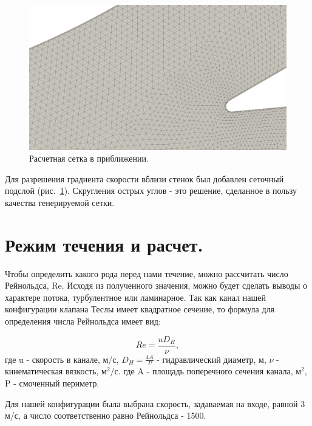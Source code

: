 \documentclass[14pt,a4paper]{article}
\begin{document}
        \begin{figure}[H]
            \centering
            \includegraphics[width = 1\linewidth]{teslaMesh2}
            \caption{Расчетная сетка в приближении.}
            \label{fig:teslaMesh2}
        \end{figure}   
             
        Для разрешения градиента скорости вблизи стенок был добавлен сеточный подслой (рис.~\ref{fig:teslaMesh2}). Скругления острых углов - это решение, сделанное в пользу качества генерируемой сетки.
        
    \section*{Режим течения и расчет.}        
        
        Чтобы определить какого рода перед нами течение, можно рассчитать число Рейнольдса, Re. Исходя из полученного значения, можно будет сделать выводы о характере потока, турбулентное или ламинарное.
        Так как канал нашей конфигурации клапана Теслы имеет квадратное сечение, то формула для определения числа Рейнольдса имеет вид:
        
        \begin{equation}\label{eqn:Re}
            Re = \frac{u D_{H}}{\nu},
        \end{equation}            
        где  u - скорость в канале, м/с, $ D_{H} = \frac{4A}{P} $ - гидравлический диаметр, м, $\nu$ - кинематическая вязкость, м$^{2}/$с. 
        где A - площадь поперечного сечения канала, м$^{2}$, P - смоченный периметр. 
        
        Для нашей конфигурации была выбрана скорость, задаваемая на входе, равной 3 м/с, а число соответственно равно Рейнольдса - 1500.
        
\end{document}
